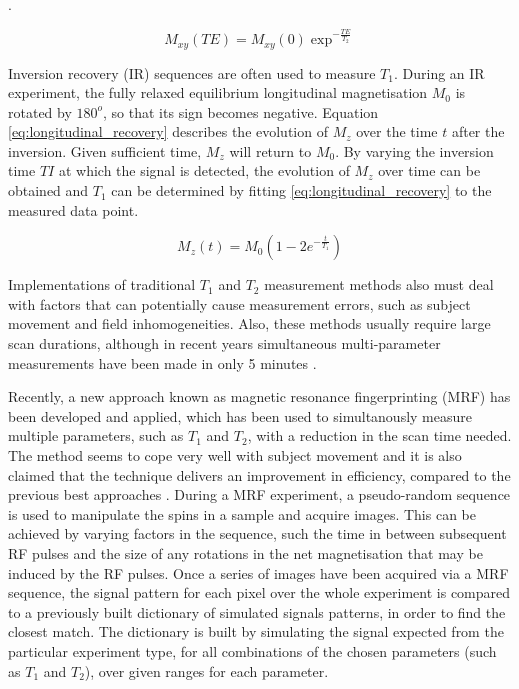 \documentclass[journal]{IEEEtran}
\begin{document}
\cite{haackemagnetic}. 

\begin{equation} \label{eq:transverse_decay}
M_{xy} (TE) = M_{xy}(0)\exp^{-\frac{TE}{T_{2}}}
\end{equation}


Inversion recovery (IR) sequences are often used to measure $T_1$. During an IR experiment, the fully relaxed equilibrium longitudinal magnetisation $M_{0}$ is rotated by $180^{o}$, so that its sign becomes negative. Equation \eqref{eq:longitudinal_recovery} describes the evolution of $M_{z}$ over the time $t$ after the inversion. Given sufficient time, $M_{z}$ will return to $M_{0}$. By varying the inversion time $TI$ at which the signal is detected, the evolution of $M_{z}$ over time can be obtained and $T_1$ can be determined by fitting  \eqref{eq:longitudinal_recovery} to the measured data point.

\begin{equation} \label{eq:longitudinal_recovery}
M_{z} (t) = M_{0}(1 - 2e^{-\frac{t}{T_1}} )
\end{equation}

Implementations of traditional $T_1$ and $T_2$ measurement methods also must deal with factors that can potentially cause measurement errors, such as subject movement and field inhomogeneities. Also, these methods usually require large scan durations, although in recent years simultaneous multi-parameter measurements have been made in only 5 minutes \cite{Warntjes2008}. %

Recently, a new approach known as magnetic resonance fingerprinting (MRF) has been developed and applied, which has been used to simultanously measure multiple parameters, such as $T_1$ and $T_2$, with a reduction in the scan time needed. The method seems to cope very well with subject movement and it is also claimed that the technique delivers an improvement in efficiency, compared to the previous best approaches \cite{ma2013magnetic, deoni2005high}. During a MRF experiment, a pseudo-random sequence is used to manipulate the spins in a sample and acquire images. This can be achieved by varying factors in the sequence, such the time in between subsequent RF pulses and the size of any rotations in the net magnetisation that may be induced by the RF pulses. Once a series of images have been acquired via a MRF sequence, the signal pattern for each pixel over the whole experiment is compared to a previously built dictionary of simulated signals patterns, in order to find the closest match. The dictionary is built by simulating the signal expected from the particular experiment type, for all combinations of the chosen parameters (such as $T_1$ and $T_2$), over given ranges for each parameter.
\end{document}
